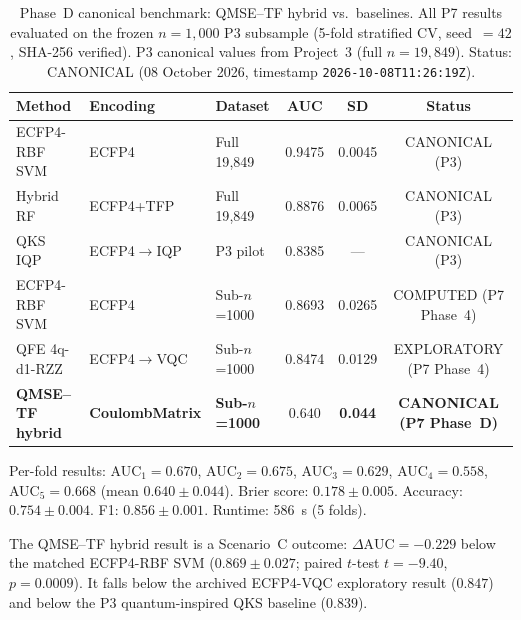 \begin{table}[htbp]
\centering
\caption{Phase~D canonical benchmark: QMSE--TF hybrid vs.\ baselines.
All P7 results evaluated on the frozen $n = 1{,}000$ P3 subsample
(5-fold stratified CV, seed~$= 42$, SHA-256 verified).
P3 canonical values from Project~3 (full $n = 19{,}849$).
Status: CANONICAL (08 October 2026, timestamp \texttt{2026-10-08T11:26:19Z}).}
\label{tab:phased_results}
\begin{tabular}{lllccc}
\toprule
Method & Encoding & Dataset & AUC & SD & Status \\
\midrule
ECFP4-RBF SVM & ECFP4 & Full 19{,}849 & 0.9475 & 0.0045 & CANONICAL (P3) \\
Hybrid RF & ECFP4+TFP & Full 19{,}849 & 0.8876 & 0.0065 & CANONICAL (P3) \\
QKS IQP & ECFP4$\to$IQP & P3 pilot & 0.8385 & --- & CANONICAL (P3) \\
\midrule
ECFP4-RBF SVM & ECFP4 & Sub-$n$=1000 & 0.8693 & 0.0265 & COMPUTED (P7 Phase~4) \\
QFE 4q-d1-RZZ & ECFP4$\to$VQC & Sub-$n$=1000 & 0.8474 & 0.0129 & EXPLORATORY (P7 Phase~4) \\
\midrule
\textbf{QMSE--TF hybrid} & \textbf{CoulombMatrix} & \textbf{Sub-}$n$\textbf{=1000}
  & $\mathbf{0.640}$ & \textbf{0.044} & \textbf{CANONICAL (P7 Phase~D)} \\
\bottomrule
\end{tabular}
\end{table}

Per-fold results: AUC$_1 = 0.670$, AUC$_2 = 0.675$, AUC$_3 = 0.629$,
AUC$_4 = 0.558$, AUC$_5 = 0.668$ (mean $0.640 \pm 0.044$).
Brier score: $0.178 \pm 0.005$. Accuracy: $0.754 \pm 0.004$.
F1: $0.856 \pm 0.001$. Runtime: 586~s (5 folds).

The QMSE--TF hybrid result is a Scenario~C outcome:
$\Delta\text{AUC} = -0.229$ below the matched ECFP4-RBF SVM
($0.869 \pm 0.027$; paired $t$-test $t = -9.40$, $p = 0.0009$).
It falls below the archived ECFP4-VQC exploratory result ($0.847$)
and below the P3 quantum-inspired QKS baseline ($0.839$).

